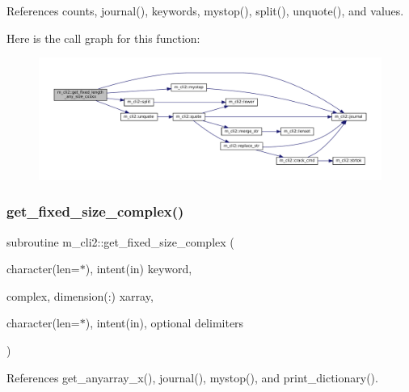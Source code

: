 References counts, journal(), keywords, mystop(), split(), unquote(), and values.

Here is the call graph for this function\+:\nopagebreak
\begin{figure}[H]
\begin{center}
\leavevmode
\includegraphics[width=350pt]{namespacem__cli2_abc31389c45dcd95b8db641b59b98b447_cgraph}
\end{center}
\end{figure}
\mbox{\label{namespacem__cli2_a32b78784e20e29bf40f17e16d08336fa}} 
\subsubsection{\texorpdfstring{get\+\_\+fixed\+\_\+size\+\_\+complex()}{get\_fixed\_size\_complex()}}
{\footnotesize\ttfamily subroutine m\+\_\+cli2\+::get\+\_\+fixed\+\_\+size\+\_\+complex (\begin{DoxyParamCaption}\item[{character(len=$\ast$), intent(in)}]{keyword,  }\item[{complex, dimension(\+:)}]{xarray,  }\item[{character(len=$\ast$), intent(in), optional}]{delimiters }\end{DoxyParamCaption})\hspace{0.3cm}{\ttfamily [private]}}



References get\+\_\+anyarray\+\_\+x(), journal(), mystop(), and print\+\_\+dictionary().

